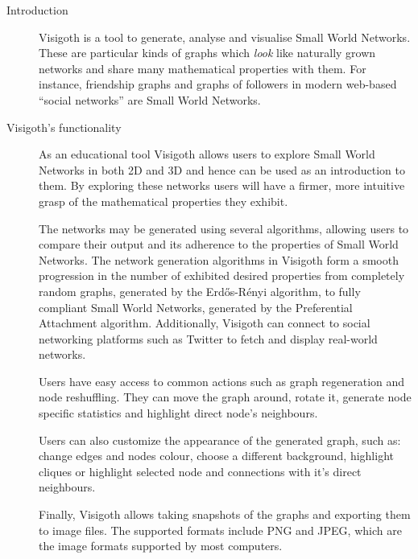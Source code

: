 \documentclass[a4paper,11pt,titlepage]{article}
\begin{document}
\begin{description}
	\item[Introduction]

    Visigoth is a tool to generate, analyse and visualise Small World
    Networks. These are particular kinds of graphs which \emph{look}
    like naturally grown networks and share many mathematical
    properties with them.  For instance, friendship graphs and graphs
    of followers in modern web-based ``social networks'' are Small
    World Networks.

	\item[Visigoth's functionality]

    As an educational tool Visigoth allows users to explore Small
    World Networks in both 2D and 3D and hence can be used as an
    introduction to them. By exploring these networks users will have
    a firmer, more intuitive grasp of the mathematical properties they
    exhibit.

    The networks may be generated using several algorithms, allowing
    users to compare their output and its adherence to the properties
    of Small World Networks. The network generation algorithms in
    Visigoth form a smooth progression in the number of exhibited
    desired properties from completely random graphs, generated by the
    Erd\H{o}s-R\'{e}nyi algorithm, to fully compliant Small World
    Networks, generated by the Preferential Attachment
    algorithm. Additionally, Visigoth can connect to social networking
    platforms such as Twitter to fetch and display real-world
    networks.

    Users have easy access to common actions such as graph
    regeneration and node reshuffling. They can move the graph around,
    rotate it, generate node specific statistics and highlight direct
    node's neighbours.

    Users can also customize the appearance of the generated graph,
    such as: change edges and nodes colour, choose a different
    background, highlight cliques or highlight selected node and
    connections with it's direct neighbours.

    Finally, Visigoth allows taking snapshots of the graphs and
    exporting them to image files. The supported formats include PNG
    and JPEG, which are the image formats supported by most computers.


\end{description}
\end{document}
